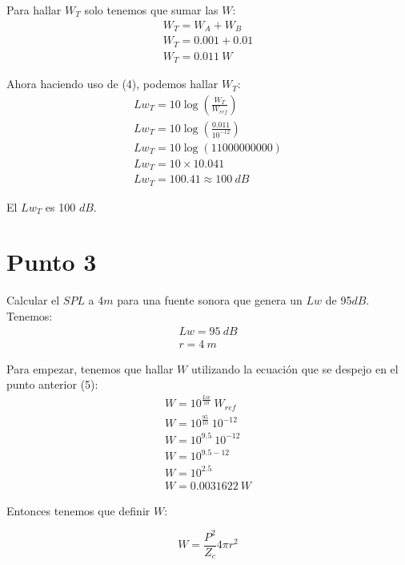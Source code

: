 \documentclass{article}
\begin{document}
Para hallar $W_T$ solo tenemos que sumar las $W$:
\begin{gather*}
    W_T = W_A + W_B\\
    W_T = 0.001 + 0.01\\
    W_T = 0.011\ W
\end{gather*}

Ahora haciendo uso de (4), podemos hallar $W_T$:
\begin{gather*}
    Lw_T = 10 \log(\frac{W_T}{W_{ref}})\\
    Lw_T = 10 \log(\frac{0.011}{10^{-12}})\\
    Lw_T = 10 \log(11000000000)\\
    Lw_T = 10 \times 10.041\\
    Lw_T = 100.41 \approx 100\ dB
\end{gather*}

El $Lw_T$ es 100 $dB$.

\section{Punto 3}

Calcular el $SPL$ a 4$m$ para una fuente sonora que genera un $Lw$ de 95$dB$.\\
Tenemos:
\begin{gather*}
    Lw = 95\ dB\\
    r = 4\ m
\end{gather*}

Para empezar, tenemos que hallar $W$ utilizando la ecuación que se despejo en el punto anterior (5):
\begin{gather*}
    W = 10^{\frac{Lw}{10}}\ W_{ref}\\
    W = 10^{\frac{95}{10}}\ 10^{-12}\\
    W = 10^{9.5}\ 10^{-12}\\
    W = 10^{9.5-12}\\
    W = 10^{2.5}\\
    W = 0.0031622\ W
\end{gather*}

Entonces tenemos que definir $W$:

\begin{equation}
    W = \frac{P^2}{Z_c} 4\pi r^2
\end{equation}
\end{document}
